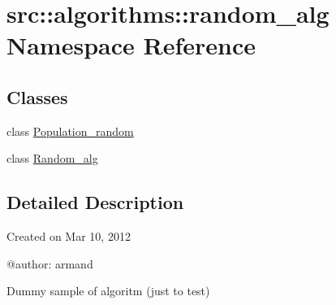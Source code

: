 \hypertarget{namespacesrc_1_1algorithms_1_1random__alg}{
\section{src::algorithms::random\_\-alg Namespace Reference}
\label{namespacesrc_1_1algorithms_1_1random__alg}
}
\subsection*{Classes}
\begin{DoxyCompactItemize}
\item 
class \hyperlink{classsrc_1_1algorithms_1_1random__alg_1_1Population__random}{Population\_\-random}
\item 
class \hyperlink{classsrc_1_1algorithms_1_1random__alg_1_1Random__alg}{Random\_\-alg}
\end{DoxyCompactItemize}


\subsection{Detailed Description}
\begin{DoxyVerb}
Created on Mar 10, 2012

@author: armand

Dummy sample of algoritm (just to test)

\end{DoxyVerb}
 